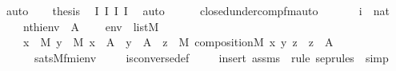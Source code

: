 \begin{isabellebody}
\ auto\isanewline
\ \ \isamarkupfalse%
\ {\isacharquery}{\kern0pt}thesis\ \isamarkupfalse%
\ I{}\ I{}\ I{}\ I{}\ \isamarkupfalse%
\ auto\ \isanewline
{}\isamarkupfalse%
%
\endisatagproof
{\isafoldproof}%
%
\isadelimproof
\isanewline
%
\endisadelimproof
\ \ \ \isanewline
{}\isamarkupfalse%
\ closed{\isacharunderscore}{\kern0pt}under{\isacharunderscore}{\kern0pt}comp{\isacharunderscore}{\kern0pt}fm{\isacharunderscore}{\kern0pt}auto{\isacharcolon}{\kern0pt}\isanewline
\ \ \isanewline
\ \ \ \ {\isachardoublequoteopen}i\ {\isasymin}\ nat{\isachardoublequoteclose}\isanewline
\ \ \ \ {\isachardoublequoteopen}nth{\isacharparenleft}{\kern0pt}i{\isacharcomma}{\kern0pt}env{\isacharparenright}{\kern0pt}\ {\isacharequal}{\kern0pt}\ A{\isachardoublequoteclose}\isanewline
\ \ \ \ {\isachardoublequoteopen}env\ {\isasymin}\ list{\isacharparenleft}{\kern0pt}M{\isacharparenright}{\kern0pt}{\isachardoublequoteclose}\ \isanewline
\ \ \isanewline
\ \ \ \ {\isachardoublequoteopen}{\isacharparenleft}{\kern0pt}{\isasymforall}x\ {\isasymin}\ M{\isachardot}{\kern0pt}\ {\isasymforall}y\ {\isasymin}\ M{\isachardot}{\kern0pt}\ x\ {\isasymin}\ A\ {\isasymlongrightarrow}\ y\ {\isasymin}\ A\ {\isasymlongrightarrow}\ {\isacharparenleft}{\kern0pt}{\isasymexists}z\ {\isasymin}\ M{\isachardot}{\kern0pt}\ composition{\isacharparenleft}{\kern0pt}{\isacharhash}{\kern0pt}{\isacharhash}{\kern0pt}M{\isacharcomma}{\kern0pt}\ x{\isacharcomma}{\kern0pt}\ y{\isacharcomma}{\kern0pt}\ z{\isacharparenright}{\kern0pt}\ {\isasymand}\ z\ {\isasymin}\ A{\isacharparenright}{\kern0pt}{\isacharparenright}{\kern0pt}\isanewline
\ \ \ \ \ {\isasymlongleftrightarrow}\ sats{\isacharparenleft}{\kern0pt}M{\isacharcomma}{\kern0pt}{\isacharquery}{\kern0pt}fm{\isacharparenleft}{\kern0pt}i{\isacharparenright}{\kern0pt}{\isacharcomma}{\kern0pt}env{\isacharparenright}{\kern0pt}{\isachardoublequoteclose}\ \isanewline
%
\isadelimproof
\ \ %
\endisadelimproof
%
\isatagproof
{}\isamarkupfalse%
\ is{\isacharunderscore}{\kern0pt}converse{\isacharunderscore}{\kern0pt}def\ \isanewline
\ \ \isamarkupfalse%
\ {\isacharparenleft}{\kern0pt}insert\ assms\ {\isacharsemicolon}{\kern0pt}\ {\isacharparenleft}{\kern0pt}rule\ sep{\isacharunderscore}{\kern0pt}rules\ {\isacharbar}{\kern0pt}\ simp{\isacharparenright}{\kern0pt}{\isacharplus}{\kern0pt}{\isacharparenright}{\kern0pt}%
\endisatagproof
{\isafoldproof}%

\end{isabellebody}
